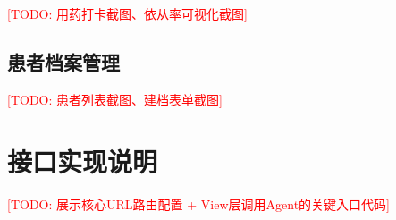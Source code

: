 \textcolor{red}{[TODO: 用药打卡截图、依从率可视化截图]}

\subsection{患者档案管理}

\textcolor{red}{[TODO: 患者列表截图、建档表单截图]}


\section{接口实现说明}

\textcolor{red}{[TODO: 展示核心URL路由配置 + View层调用Agent的关键入口代码]}

